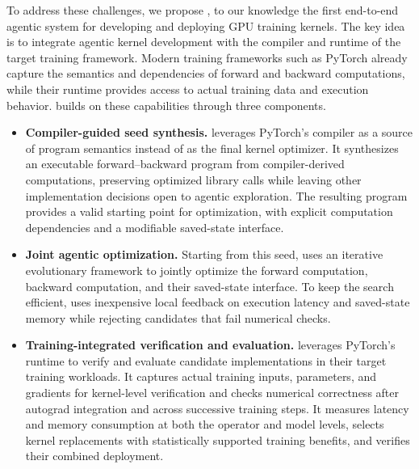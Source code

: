 To address these challenges, we propose \method, to our knowledge the first end-to-end agentic system for developing and deploying GPU training kernels. The key idea is to integrate agentic kernel development with the compiler and runtime of the target training framework. Modern training frameworks such as PyTorch already capture the semantics and dependencies of forward and backward computations, while their runtime provides access to actual training data and execution behavior. \method builds on these capabilities through three components.
\begin{itemize}
    \item \textbf{Compiler-guided seed synthesis.} \method leverages PyTorch's compiler as a source of program semantics instead of as the final kernel optimizer. It synthesizes an executable forward--backward program from compiler-derived computations, preserving optimized library calls while leaving other implementation decisions open to agentic exploration. The resulting program provides a valid starting point for optimization, with explicit computation dependencies and a modifiable saved-state interface.
    \item \textbf{Joint agentic optimization.} Starting from this seed, \method uses an iterative evolutionary framework to jointly optimize the forward computation, backward computation, and their saved-state interface. To keep the search efficient, \method uses inexpensive local feedback on execution latency and saved-state memory while rejecting candidates that fail numerical checks. 
    \item \textbf{Training-integrated verification and evaluation.} \method leverages PyTorch's runtime to verify and evaluate candidate implementations in their target training workloads. It captures actual training inputs, parameters, and gradients for kernel-level verification and checks numerical correctness after autograd integration and across successive training steps. It measures latency and memory consumption at both the operator and model levels, selects kernel replacements with statistically supported training benefits, and verifies their combined deployment.
\end{itemize}


